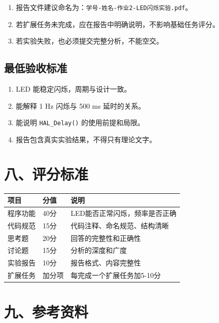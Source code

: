 \documentclass[
  chinese,
  UTF8,
  oneside,
  openany]{ctexbook}
\providecommand{\tightlist}{%
  \setlength{\itemsep}{0pt}\setlength{\parskip}{0pt}}
\begin{document}
\begin{enumerate}
\def\labelenumi{\arabic{enumi}.}
\tightlist
\item
  报告文件建议命名为：\texttt{学号-姓名-作业2-LED闪烁实验.pdf}。
\item
  若扩展任务未完成，应在报告中明确说明，不影响基础任务评分。
\item
  若实验失败，也必须提交完整分析，不能空交。
\end{enumerate}

\subsection{最低验收标准}\label{ux6700ux4f4eux9a8cux6536ux6807ux51c6-1}

\begin{enumerate}
\def\labelenumi{\arabic{enumi}.}
\tightlist
\item
  LED 能稳定闪烁，周期与设计一致。
\item
  能解释 1 Hz 闪烁与 500 ms 延时的关系。
\item
  能说明 \texttt{HAL\_Delay()} 的使用前提和局限。
\item
  报告包含真实实验结果，不得只有理论文字。
\end{enumerate}

\section{八、评分标准}\label{ux516bux8bc4ux5206ux6807ux51c6}

\begin{longtable}[]{@{}lll@{}}
\toprule\noalign{}
项目 & 分值 & 说明 \\
\midrule\noalign{}
\endhead
\bottomrule\noalign{}
\endlastfoot
程序功能 & 40分 & LED能否正常闪烁，频率是否正确 \\
代码规范 & 15分 & 代码注释、命名规范、结构清晰 \\
思考题 & 20分 & 回答的完整性和正确性 \\
讨论题 & 15分 & 分析的深度和广度 \\
实验报告 & 10分 & 报告格式、内容完整性 \\
扩展任务 & 加分项 & 每完成一个扩展任务加5-10分 \\
\end{longtable}

\section{九、参考资料}\label{ux4e5dux53c2ux8003ux8d44ux6599}
\end{document}
